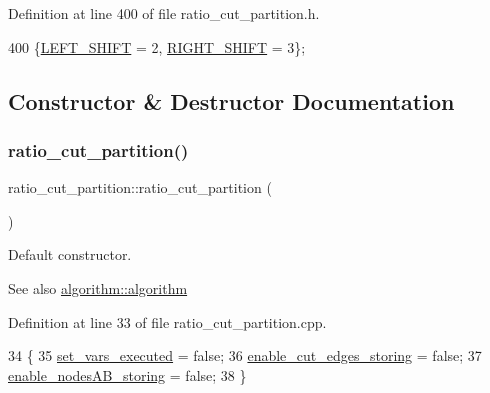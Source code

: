 Definition at line 400 of file ratio\+\_\+cut\+\_\+partition.\+h.


\begin{DoxyCode}
400 \{\mbox{\hyperlink{classratio__cut__partition_a8e2de20fc9f5cbe941aefa1c21c9b5caa286b78408a1c94c92f841b80313428e7}{LEFT\_SHIFT}} = 2, \mbox{\hyperlink{classratio__cut__partition_a8e2de20fc9f5cbe941aefa1c21c9b5caa94c4c2223116686ce19e42cf4ccbe511}{RIGHT\_SHIFT}} = 3\};
\end{DoxyCode}


\subsection{Constructor \& Destructor Documentation}
\mbox{\label{classratio__cut__partition_a56e283d4ec5a06115146982e86c65878}} 
\subsubsection{\texorpdfstring{ratio\+\_\+cut\+\_\+partition()}{ratio\_cut\_partition()}}
{\footnotesize\ttfamily ratio\+\_\+cut\+\_\+partition\+::ratio\+\_\+cut\+\_\+partition (\begin{DoxyParamCaption}{ }\end{DoxyParamCaption})}

Default constructor.

\begin{DoxySeeAlso}{See also}
\mbox{\hyperlink{classalgorithm_ab79e1ddec2f2afdf4b36b10724db8b15}{algorithm\+::algorithm}} 
\end{DoxySeeAlso}


Definition at line 33 of file ratio\+\_\+cut\+\_\+partition.\+cpp.


\begin{DoxyCode}
34 \{
35     \mbox{\hyperlink{classratio__cut__partition_aa722d032cb59664894c6301ceee86729}{set\_vars\_executed}} = \textcolor{keyword}{false};
36     \mbox{\hyperlink{classratio__cut__partition_a7f2ddebc25563a35cb6424f7a5d4b549}{enable\_cut\_edges\_storing}} = \textcolor{keyword}{false};
37     \mbox{\hyperlink{classratio__cut__partition_a6dff7e2e6cecdc63147fdee71d876a34}{enable\_nodesAB\_storing}} = \textcolor{keyword}{false};
38 \}
\end{DoxyCode}
\mbox{\label{classratio__cut__partition_a5fe4f3a926fd07a1af46cce9acdbb849}} 
